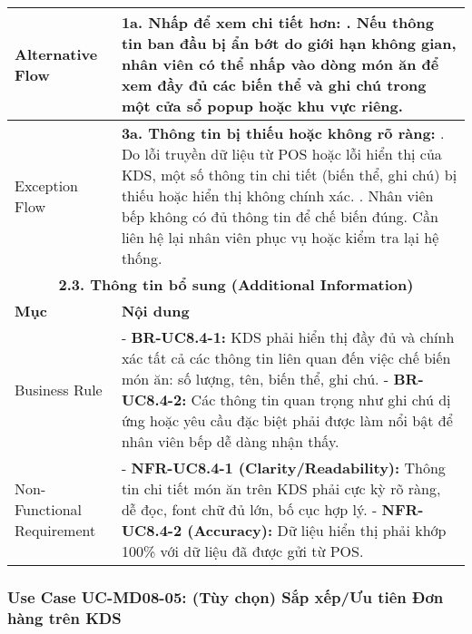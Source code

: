 \begin{longtable}{|m{4cm}|p{11cm}|}
\hline
Alternative Flow & \textbf{1a. Nhấp để xem chi tiết hơn:} \newline    1. Nếu thông tin ban đầu bị ẩn bớt do giới hạn không gian, nhân viên có thể nhấp vào dòng món ăn để xem đầy đủ các biến thể và ghi chú trong một cửa sổ popup hoặc khu vực riêng. \\
\hline
Exception Flow & \textbf{3a. Thông tin bị thiếu hoặc không rõ ràng:} \newline    1. Do lỗi truyền dữ liệu từ POS hoặc lỗi hiển thị của KDS, một số thông tin chi tiết (biến thể, ghi chú) bị thiếu hoặc hiển thị không chính xác. \newline    2. Nhân viên bếp không có đủ thông tin để chế biến đúng. Cần liên hệ lại nhân viên phục vụ hoặc kiểm tra lại hệ thống. \\
\hline
\multicolumn{2}{|c|}{\textbf{2.3. Thông tin bổ sung (Additional Information)}} \\
\hline
\textbf{Mục} & \textbf{Nội dung} \\
\hline
Business Rule & - \textbf{BR-UC8.4-1:} KDS phải hiển thị đầy đủ và chính xác tất cả các thông tin liên quan đến việc chế biến món ăn: số lượng, tên, biến thể, ghi chú. \newline - \textbf{BR-UC8.4-2:} Các thông tin quan trọng như ghi chú dị ứng hoặc yêu cầu đặc biệt phải được làm nổi bật để nhân viên bếp dễ dàng nhận thấy. \\
\hline
Non-Functional Requirement & - \textbf{NFR-UC8.4-1 (Clarity/Readability):} Thông tin chi tiết món ăn trên KDS phải cực kỳ rõ ràng, dễ đọc, font chữ đủ lớn, bố cục hợp lý. \newline - \textbf{NFR-UC8.4-2 (Accuracy):} Dữ liệu hiển thị phải khớp 100\% với dữ liệu đã được gửi từ POS. \\
\hline
\end{longtable}

\subsubsection{Use Case UC-MD08-05: (Tùy chọn) Sắp xếp/Ưu tiên Đơn hàng trên KDS}

